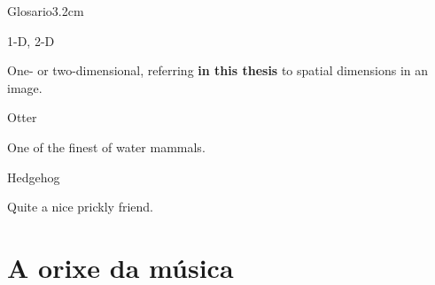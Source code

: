 \documentclass[a4paper, twoside]{templates/ociamthesis}
\begin{document}
\begin{romanpages}
  \dominitoc %
  \dominilof  %
  \dominilot  %

\flushbottom

\tableofcontents

\listoffigures
	\mtcaddchapter

\listoftables
  \mtcaddchapter
\begin{mclistof}{Glosario}{3.2cm}

\item[1-D, 2-D]

One- or two-dimensional, referring \textbf{in this thesis} to spatial dimensions in an image.

\item[Otter]

One of the finest of water mammals.

\item[Hedgehog]

Quite a nice prickly friend.

\end{mclistof} 


\end{romanpages}

\flushbottom

\hypertarget{a-orixe-da-muxfasica}{%
\chapter*{A orixe da música}\label{a-orixe-da-muxfasica}}
\end{document}
